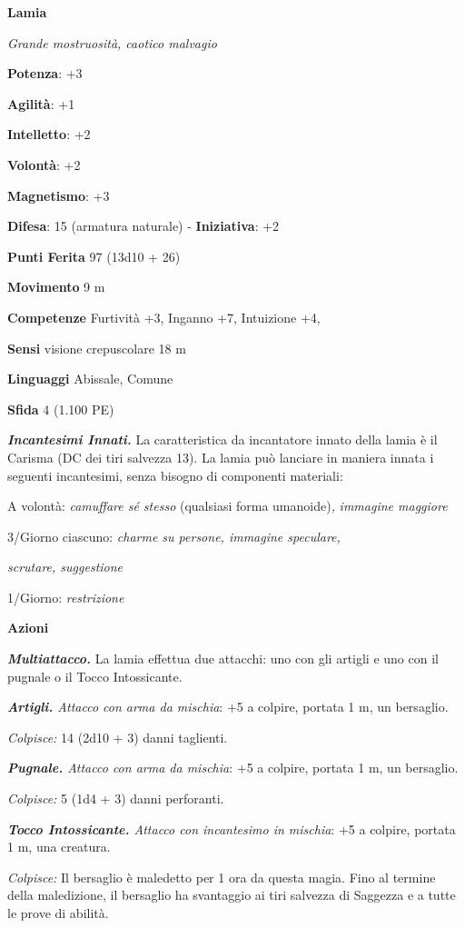 \begin{multicols}{2}
\textbf{Lamia}

\emph{Grande mostruosità, caotico malvagio}

\textbf{Potenza}: +3

\textbf{Agilità}: +1

\textbf{Intelletto}: +2

\textbf{Volontà}: +2

\textbf{Magnetismo}: +3

\textbf{Difesa}: 15 (armatura naturale) - \textbf{Iniziativa}: +2

\textbf{Punti Ferita} 97 (13d10 + 26)

\textbf{Movimento} 9 m

\textbf{Competenze} Furtività +3, Inganno +7, Intuizione +4,

\textbf{Sensi} visione crepuscolare 18 m

\textbf{Linguaggi} Abissale, Comune

\textbf{Sfida} 4 (1.100 PE)\smallskip

\emph{\textbf{Incantesimi Innati.}} La caratteristica da incantatore
innato della lamia è il Carisma (DC dei tiri salvezza 13). La lamia può
lanciare in maniera innata i seguenti incantesimi, senza bisogno di
componenti materiali:

A volontà: \emph{camuffare sé stesso} (qualsiasi forma umanoide)\emph{,}
\emph{immagine maggiore}

3/Giorno ciascuno: \emph{charme su persone, immagine speculare,}

\emph{scrutare, suggestione}

1/Giorno: \emph{restrizione}

\smallskip\textbf{Azioni}

\emph{\textbf{Multiattacco.}} La lamia effettua due attacchi: uno con
gli artigli e uno con il pugnale o il Tocco Intossicante.

\emph{\textbf{Artigli.} Attacco con arma da mischia}: +5 a colpire,
portata 1 m, un bersaglio.

\emph{Colpisce:} 14 (2d10 + 3) danni taglienti.

\emph{\textbf{Pugnale.} Attacco con arma da mischia}: +5 a colpire,
portata 1 m, un bersaglio.

\emph{Colpisce:} 5 (1d4 + 3) danni perforanti.

\emph{\textbf{Tocco Intossicante.} Attacco con incantesimo in mischia}:
+5 a colpire, portata 1 m, una creatura.

\emph{Colpisce:} Il bersaglio è maledetto per 1 ora da questa magia.
Fino al termine della maledizione, il bersaglio ha svantaggio ai tiri
salvezza di Saggezza e a tutte le prove di abilità.


\end{multicols}
